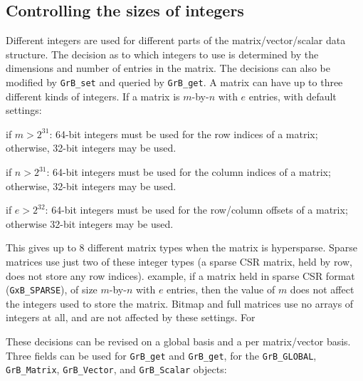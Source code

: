 
\subsection{Controlling the sizes of integers}
\label{integer_bits}

Different integers are used for different parts of the matrix/vector/scalar
data structure.  The decision as to which integers to use is determined by the
dimensions and number of entries in the matrix.  The decisions can also be
modified by \verb'GrB_set' and queried by \verb'GrB_get'.  A matrix can have up
to three different kinds of integers.  If a matrix is $m$-by-$n$ with $e$
entries, with default settings:

\begin{packed_itemize}
\item if $m > 2^{31}$: 64-bit integers must be used for the row indices of a
matrix; otherwise, 32-bit integers may be used.
\item if $n > 2^{31}$: 64-bit integers must be used for the column indices of a
matrix; otherwise, 32-bit integers may be used.
\item if $e > 2^{32}$: 64-bit integers must be used for the row/column offsets of
a matrix; otherwise 32-bit integers may be used.
\end{packed_itemize}

This gives up to 8 different matrix types when the matrix is hypersparse.
Sparse matrices use just two of these integer types (a sparse CSR matrix, held
by row, does not store any row indices).  example, if a matrix held in sparse
CSR format (\verb'GxB_SPARSE'), of size $m$-by-$n$ with $e$ entries, then the
value of $m$ does not affect the integers used to store the matrix.  Bitmap and
full matrices use no arrays of integers at all, and are not affected by these
settings.  For

These decisions can be revised on a global basis and a per matrix/vector basis.
Three fields can be used for \verb'GrB_get' and \verb'GrB_get', for the
\verb'GrB_GLOBAL', \verb'GrB_Matrix', \verb'GrB_Vector', and \verb'GrB_Scalar'
objects:


